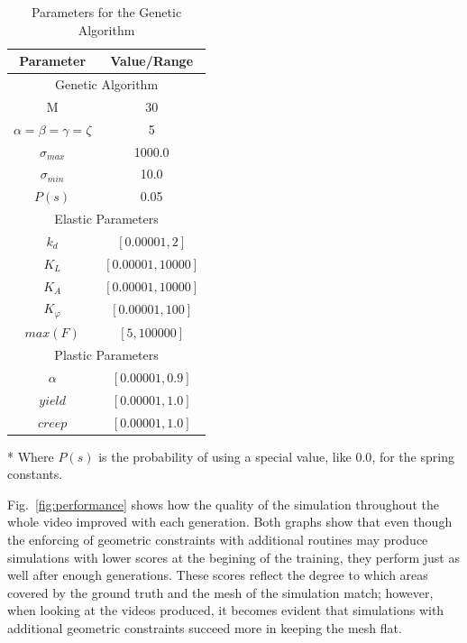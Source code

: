 \documentclass[journal]{IEEEtran}
\newcommand{\fref}[1]{Fig.~\ref{#1}}
\begin{document}
\begin{table}[!t]
 \renewcommand{\arraystretch}{1.3}
 \caption{Parameters for the Genetic Algorithm}
 \label{tab:gen_params}
 \centering
\begin{tabular}{cc}
\hline
 \bfseries Parameter & \bfseries Value/Range \\  \hline
 \multicolumn{2}{c}{Genetic Algorithm} \\ \hline
 M & 30 \\
 $\alpha = \beta = \gamma = \zeta$  & 5 \\
 $\sigma_{max}$                     & 1000.0 \\
 $\sigma_{min}$                     & 10.0 \\
 $P(s)$                             & 0.05 \\ \hline
 \multicolumn{2}{c}{Elastic Parameters } \\ \hline
 $k_d$                              & $[0.00001, 2]$ \\
 $K_L$                              & $[0.00001, 10000]$ \\
 $K_A$                              & $[0.00001, 10000]$ \\
 $K_{\varphi}$                      & $[0.00001, 100]$ \\
 $max(F)$                           & $[5, 100000]$ \\ \hline
 \multicolumn{2}{c}{Plastic Parameters } \\ \hline
 $\alpha$                           & $[0.00001, 0.9]$ \\
 $yield$                            & $[0.00001, 1.0]$ \\
 $creep$                            & $[0.00001, 1.0]$ \\ \hline
\end{tabular}

\vspace*{1em}
* Where $P(s)$ is the probability of using a special value, like $0.0$, for the spring constants.
\end{table}


\fref{fig:performance} shows how the quality of the simulation throughout the whole video improved with each generation.  Both graphs show that even though the enforcing of geometric constraints with additional routines may produce simulations with lower scores at the begining of the training, they perform just as well after enough generations.  These scores reflect the degree to which areas covered by the ground truth and the mesh of the simulation match; however, when looking at the videos produced, it becomes evident that simulations with additional geometric constraints succeed more in keeping the mesh flat. %
\end{document}
